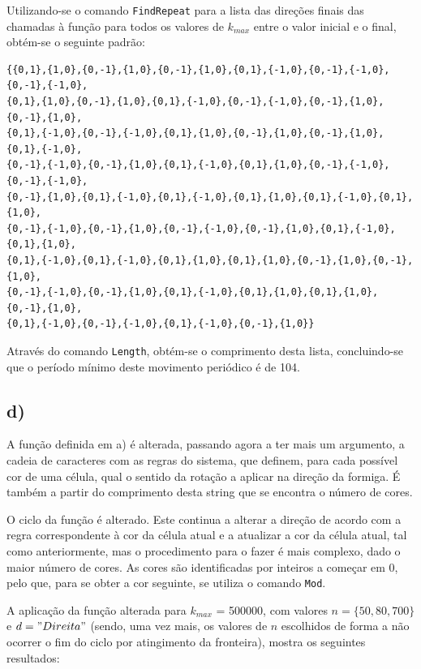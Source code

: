 \documentclass[12pt,a4paper]{article}
\begin{document}
        Utilizando-se o comando \texttt{FindRepeat} para a lista das direções finais das chamadas à função para todos os valores de \(k_{max}\) entre o valor inicial e o final, obtém-se o seguinte padrão:

        \begin{verbatim}
{{0,1},{1,0},{0,-1},{1,0},{0,-1},{1,0},{0,1},{-1,0},{0,-1},{-1,0},{0,-1},{-1,0},
{0,1},{1,0},{0,-1},{1,0},{0,1},{-1,0},{0,-1},{-1,0},{0,-1},{1,0},{0,-1},{1,0},
{0,1},{-1,0},{0,-1},{-1,0},{0,1},{1,0},{0,-1},{1,0},{0,-1},{1,0},{0,1},{-1,0},
{0,-1},{-1,0},{0,-1},{1,0},{0,1},{-1,0},{0,1},{1,0},{0,-1},{-1,0},{0,-1},{-1,0},
{0,-1},{1,0},{0,1},{-1,0},{0,1},{-1,0},{0,1},{1,0},{0,1},{-1,0},{0,1},{1,0},
{0,-1},{-1,0},{0,-1},{1,0},{0,-1},{-1,0},{0,-1},{1,0},{0,1},{-1,0},{0,1},{1,0},
{0,1},{-1,0},{0,1},{-1,0},{0,1},{1,0},{0,1},{1,0},{0,-1},{1,0},{0,-1},{1,0},
{0,-1},{-1,0},{0,-1},{1,0},{0,1},{-1,0},{0,1},{1,0},{0,1},{1,0},{0,-1},{1,0},
{0,1},{-1,0},{0,-1},{-1,0},{0,1},{-1,0},{0,-1},{1,0}}
        \end{verbatim}

        Através do comando \texttt{Length}, obtém-se o comprimento desta lista, concluindo-se que o período mínimo deste movimento periódico é de 104.

    \newpage
    \subsection{d)}
        A função definida em a) é alterada, passando agora a ter mais um argumento, a cadeia de caracteres com as regras do sistema, que definem, para cada possível cor de uma célula, qual o sentido da rotação a aplicar na direção da formiga. É também a partir do comprimento desta string que se encontra o número de cores.

        O ciclo da função é alterado. Este continua a alterar a direção de acordo com a regra correspondente à cor da célula atual e a atualizar a cor da célula atual, tal como anteriormente, mas o procedimento para o fazer é mais complexo, dado o maior número de cores. As cores são identificadas por inteiros a começar em 0, pelo que, para se obter a cor seguinte, se utiliza o comando \texttt{Mod}.

        A aplicação da função alterada para \(k_{max}\) = 500000, com valores \(n = \{50, 80, 700\}\) e \(d = "Direita"\) (sendo, uma vez mais, os valores de \(n\) escolhidos de forma a não ocorrer o fim do ciclo por atingimento da fronteira), mostra os seguintes resultados: \\
        
\end{document}
